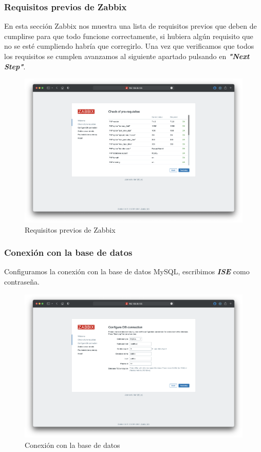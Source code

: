     \subsubsection{Requisitos previos de Zabbix}
    En esta sección Zabbix nos muestra una lista de requisitos previos que deben de cumplirse para que todo funcione correctamente, si hubiera algún requisito que no se esté 
    cumpliendo habría que corregirlo. Una vez que verificamos que todos los requisitos se cumplen avanzamos al siguiente apartado pulsando en \textbf{\emph{"Next Step"}}.
    \begin{figure}[H]
        \centering
        \includegraphics[scale=0.25]{images/zabbix_installation_2.png}
        \caption{Requisitos previos de Zabbix}
        \label{fig:zabbix_installation_2}
    \end{figure}

    \subsubsection{Conexión con la base de datos}
    Configuramos la conexión con la base de datos MySQL, escribimos \textbf{\emph{ISE}} como contraseña.
    \begin{figure}[H]
        \centering
        \includegraphics[scale=0.25]{images/zabbix_installation_3.png}
        \caption{Conexión con la base de datos}
        \label{fig:zabbix_installation_3}
    \end{figure}

